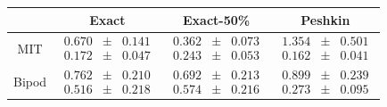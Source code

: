 \documentclass[conference]{IEEEtran}
\begin{document}
\begin{table}[t]
  \begin{center}
      \begin{tabular}[c]{cccc}
        \toprule
        & Exact & Exact-50\% & Peshkin \\
        \midrule
        MIT & $\begin{matrix}0.670\\0.172\end{matrix} \begin{matrix}\pm\\\pm\end{matrix} \begin{matrix}0.141\\ 0.047\end{matrix}$ & $\begin{matrix}\mathbf{0.362}\\\mathbf{0.243}\end{matrix} \begin{matrix}\pm\\\pm\end{matrix} \begin{matrix}0.073\\ 0.053\end{matrix}$ & $\begin{matrix}1.354\\0.162\end{matrix} \begin{matrix}\pm\\\pm\end{matrix} \begin{matrix}0.501\\ 0.041\end{matrix}$ \\
        \midrule
        Bipod & $\begin{matrix}0.762\\0.516\end{matrix} \begin{matrix}\pm\\\pm\end{matrix} \begin{matrix}0.210\\ 0.218\end{matrix}$ & $\begin{matrix}\mathbf{0.692}\\\mathbf{0.574}\end{matrix} \begin{matrix}\pm\\\pm\end{matrix} \begin{matrix}0.213\\ 0.216\end{matrix}$ & $\begin{matrix}0.899\\0.273\end{matrix} \begin{matrix}\pm\\\pm\end{matrix} \begin{matrix}0.239\\0.095\end{matrix}$ \\

\end{tabular}
\end{center}
\end{table}
\end{document}
